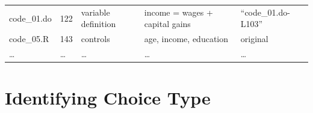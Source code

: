 \documentclass[]{book}
\begin{document}
\begin{longtable}[]{@{}lllll@{}}
\begin{minipage}[t]{0.10\columnwidth}
code\_01.do\strut
\end{minipage} & \begin{minipage}[t]{0.11\columnwidth}\raggedright
122\strut
\end{minipage} & \begin{minipage}[t]{0.18\columnwidth}\raggedright
variable definition\strut
\end{minipage} & \begin{minipage}[t]{0.28\columnwidth}\raggedright
income = wages + capital gains\strut
\end{minipage} & \begin{minipage}[t]{0.18\columnwidth}\raggedright
``code\_01.do-L103''\strut
\end{minipage}\tabularnewline
\begin{minipage}[t]{0.10\columnwidth}\raggedright
code\_05.R\strut
\end{minipage} & \begin{minipage}[t]{0.11\columnwidth}\raggedright
143\strut
\end{minipage} & \begin{minipage}[t]{0.18\columnwidth}\raggedright
controls\strut
\end{minipage} & \begin{minipage}[t]{0.28\columnwidth}\raggedright
age, income, education\strut
\end{minipage} & \begin{minipage}[t]{0.18\columnwidth}\raggedright
original\strut
\end{minipage}\tabularnewline
\begin{minipage}[t]{0.10\columnwidth}\raggedright
\ldots{}\strut
\end{minipage} & \begin{minipage}[t]{0.11\columnwidth}\raggedright
\ldots{}\strut
\end{minipage} & \begin{minipage}[t]{0.18\columnwidth}\raggedright
\ldots{}\strut
\end{minipage} & \begin{minipage}[t]{0.28\columnwidth}\raggedright
\ldots{}\strut
\end{minipage} & \begin{minipage}[t]{0.18\columnwidth}\raggedright
\ldots{}\strut
\end{minipage}\tabularnewline
\bottomrule
\end{longtable}

\hypertarget{id-analy}{%
\section{Identifying Choice Type}\label{id-analy}}
\end{document}
